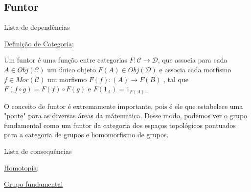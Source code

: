 \subsection{Funtor}
\label{funtor-categorias-def}
\begin{titlemize}{Lista de dependências}
	\item \hyperref[categorias-def]{Definição de Categoria};\\ %
\end{titlemize}
\begin{defi}
	Um funtor é uma função entre categorias $F: \mathcal{C} \longrightarrow \mathcal{D}$, que associa para cada $A \in Obj(\mathcal{C})$ um único objeto $F(A) \in Obj(\mathcal{D})$ e associa cada morfismo $f \in Mor(\mathcal{C})$ um morfismo $F(f): (A) \longrightarrow F(B)$ , tal que $F(f \circ g) = F(f) \circ F(g) $ e $F(1_A) = 1_{F(A)}$.
\end{defi}

O conceito de funtor é extremamente importante, pois é ele que estabelece uma "ponte" para as diversas áreas da mátematica. Desse modo, podemos ver o grupo fundamental como um funtor da categoria dos espaços topológicos pontuados para a categoria de grupos e homomorfismo de grupos.

\begin{titlemize}{Lista de consequências}
	\item \hyperref[homotopia]{Homotopia};\\ %
	\item \hyperref[grupo-fundamental]{Grupo fundamental}
\end{titlemize}

